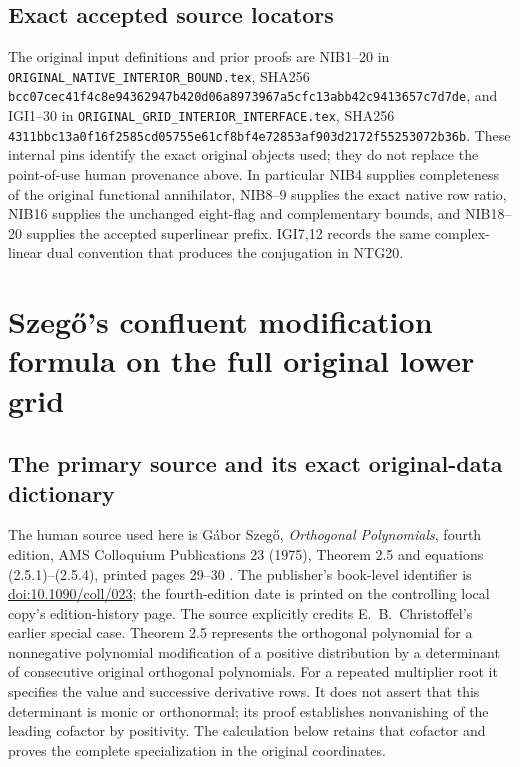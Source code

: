 \documentclass[11pt,a4paper]{article}
\begin{document}
\subsection{Exact accepted source locators}
\begingroup\raggedright
The original input definitions and prior proofs are NIB1--20
in \texttt{ORIGINAL\_\allowbreak NATIVE\_\allowbreak INTERIOR\_\allowbreak BOUND.tex},
SHA256
\texttt{bcc07cec\allowbreak 41f4c8e9\allowbreak 4362947b\allowbreak 420d06a8\allowbreak 973967a5\allowbreak cfc13abb\allowbreak 42c94136\allowbreak 57c7d7de},
and IGI1--30 in
\texttt{ORIGINAL\_\allowbreak GRID\_\allowbreak INTERIOR\_\allowbreak INTERFACE.tex}, SHA256
\texttt{4311bbc1\allowbreak 3a0f16f2\allowbreak 585cd057\allowbreak 55e61cf8\allowbreak bf4e7285\allowbreak 3af903d2\allowbreak 172f5525\allowbreak 3072b36b}.
These internal pins identify the exact original objects used;
they do not replace the point-of-use human provenance above.
In particular NIB4 supplies completeness of the original
functional annihilator, NIB8--9 supplies the exact native
row ratio, NIB16 supplies the unchanged eight-flag and
complementary bounds, and NIB18--20 supplies the accepted
superlinear prefix. IGI7,12 records the same complex-linear
dual convention that produces the conjugation in NTG20.
\par\endgroup
\endgroup

\label{MTBUILD:ORIGINAL_NATIVE_TAIL_GRAM:end}

\clearpage
\label{MTBUILD:SZEGO_LOWER_GRID_CONTROL:start}
\begingroup
\section{Szeg\H{o}'s confluent modification formula on the full original lower grid}
\label{sec:SLC}

\subsection{The primary source and its exact original-data dictionary}
The human source used here is G\'abor Szeg\H{o},
\emph{Orthogonal Polynomials}, fourth edition, AMS Colloquium
Publications 23 (1975), Theorem 2.5 and equations
(2.5.1)--(2.5.4), printed pages 29--30
\cite[Theorem 2.5, pp.~29--30]{human:szego1975}.
The publisher's book-level identifier is
\href{https://doi.org/10.1090/coll/023}{doi:10.1090/coll/023};
the fourth-edition date is printed on the controlling
local copy's edition-history page. The source explicitly
credits E.\ B.\ Christoffel's earlier special case.
Theorem 2.5 represents the orthogonal polynomial for a
nonnegative polynomial modification of a positive distribution
by a determinant of consecutive original orthogonal polynomials.
For a repeated multiplier root it specifies the value and
successive derivative rows. It does not assert that this
determinant is monic or orthonormal; its proof establishes
nonvanishing of the leading cofactor by positivity.
The calculation below retains that cofactor and proves the
complete specialization in the original coordinates.
\end{document}
